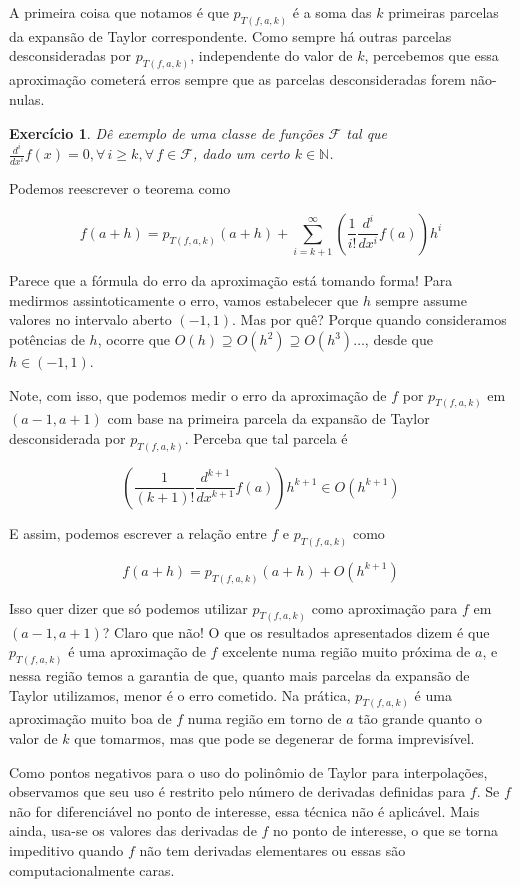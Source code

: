 \documentclass[]{article}
\newtheorem{exercicio}{Exercício}
\numberwithin{equation}{section}
\begin{document}
A primeira coisa que notamos é que $p_{T(f, a, k)}$ é a soma das $k$
primeiras parcelas da expansão de Taylor correspondente. Como sempre
há outras parcelas desconsideradas por $p_{T(f, a, k)}$, independente
do valor de $k$, percebemos que essa aproximação cometerá erros sempre
que as parcelas desconsideradas forem não-nulas.

\begin{exercicio}
  Dê exemplo de uma classe de funções $\mathcal{F}$ tal que
  $\frac{d^i}{dx^i} f(x) = 0, \forall\, i \geq k, \forall\, f \in
  \mathcal{F}$, dado um certo $k \in \mathbb{N}$.
\end{exercicio}

Podemos reescrever o teorema como

$$
f(a + h) = p_{T(f, a, k)}(a + h) + \sum_{i = k + 1}^{\infty}
\left(\frac{1}{i!} \frac{d^i}{dx^i} f(a)\right)h^i
$$

Parece que a fórmula do erro da aproximação está tomando forma! Para
medirmos assintoticamente o erro, vamos estabelecer que $h$ sempre
assume valores no intervalo aberto $(-1, 1)$. Mas por quê? Porque
quando consideramos potências de $h$, ocorre que
$O(h) \supseteq O(h^2) \supseteq O(h^3) \dots$, desde que
$h \in (-1, 1)$.

Note, com isso, que podemos medir o erro da aproximação de $f$ por
$p_{T(f, a, k)}$ em $(a - 1, a + 1)$ com base na primeira parcela da
expansão de Taylor desconsiderada por $p_{T(f, a, k)}$. Perceba que
tal parcela é

$$
\left(\frac{1}{(k + 1)!} \frac{d^{k + 1}}{dx^{k + 1}} f(a)\right)h^{k
  + 1} \in O(h^{k + 1})
$$

E assim, podemos escrever a relação entre $f$ e $p_{T(f, a, k)}$ como

$$
f(a + h) = p_{T(f, a, k)}(a + h) + O(h^{k + 1})
$$

Isso quer dizer que só podemos utilizar $p_{T(f, a, k)}$ como
aproximação para $f$ em $(a - 1, a + 1)$? Claro que não! O que os
resultados apresentados dizem é que $p_{T(f, a, k)}$ é uma aproximação
de $f$ excelente numa região muito próxima de $a$, e nessa região
temos a garantia de que, quanto mais parcelas da expansão de Taylor
utilizamos, menor é o erro cometido. Na prática, $p_{T(f, a, k)}$ é
uma aproximação muito boa de $f$ numa região em torno de $a$ tão
grande quanto o valor de $k$ que tomarmos, mas que pode se degenerar
de forma imprevisível.

Como pontos negativos para o uso do polinômio de Taylor para
interpolações, observamos que seu uso é restrito pelo número de
derivadas definidas para $f$. Se $f$ não for diferenciável no ponto de
interesse, essa técnica não é aplicável. Mais ainda, usa-se os valores
das derivadas de $f$ no ponto de interesse, o que se torna impeditivo
quando $f$ não tem derivadas elementares ou essas são
computacionalmente caras.
\end{document}
